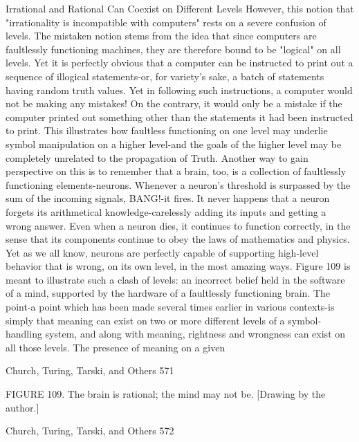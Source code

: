 {          Irrational and Rational Can Coexist on Different Levels
         However, this notion that "irrationality is incompatible with computers" rests on a
         severe confusion of levels. The mistaken notion stems from the idea that since
         computers are faultlessly functioning machines, they are therefore bound to be
         "logical" on all levels. Yet it is perfectly obvious that a computer can be
         instructed to print out a sequence of illogical statements-or, for variety's sake, a
         batch of statements having random truth values. Yet in following such
         instructions, a computer would not be making any mistakes! On the contrary, it
         would only be a mistake if the computer printed out something other than the
         statements it had been instructed to print. This illustrates how faultless
         functioning on one level may underlie symbol manipulation on a higher level-and
         the goals of the higher level may be completely unrelated to the propagation of
         Truth.
Another way to gain perspective on this is to remember that a brain, too, is a collection of
faultlessly functioning elements-neurons. Whenever a neuron's threshold is surpassed by
the sum of the incoming signals, BANG!-it fires. It never happens that a neuron forgets
its arithmetical knowledge-carelessly adding its inputs and getting a wrong answer. Even
when a neuron dies, it continues to function correctly, in the sense that its components
continue to obey the laws of mathematics and physics. Yet as we all know, neurons are
perfectly capable of supporting high-level behavior that is wrong, on its own level, in the
most amazing ways. Figure 109 is meant to illustrate such a clash of levels: an incorrect
belief held in the software of a mind, supported by the hardware of a faultlessly
functioning brain.
         The point-a point which has been made several times earlier in various contexts-is
simply that meaning can exist on two or more different levels of a symbol-handling
system, and along with meaning, rightness and wrongness can exist on all those levels.
The presence of meaning on a given




Church, Turing, Tarski, and Others                                                       571

FIGURE 109. The brain is rational; the mind may not be. [Drawing by the author.]




Church, Turing, Tarski, and Others                                                 572

}
